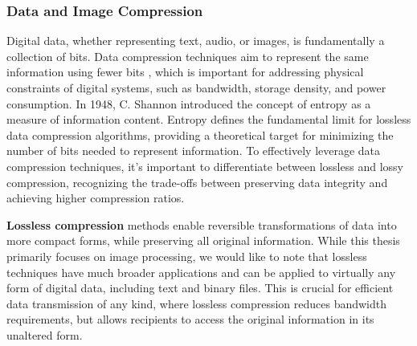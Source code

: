 \subsubsection{Data and Image Compression}
\label{sec:data-and-image-compression}



Digital data, whether representing text, audio, or images, is fundamentally a collection of bits. Data compression techniques aim to represent the same information using fewer bits \cite{hoffman2012data-compression}, which is important for addressing physical constraints of digital systems, such as bandwidth, storage density, and power consumption. In 1948, C. Shannon introduced \cite{shannon1948mathematical} the concept of entropy as a measure of information content. Entropy defines the fundamental limit for lossless data compression algorithms, providing a theoretical target for minimizing the number of bits needed to represent information. To effectively leverage data compression techniques, it's important to differentiate between lossless and lossy compression, recognizing the trade-offs between preserving data integrity and achieving higher compression ratios.



\textbf{Lossless compression} methods enable reversible transformations of data into more compact forms, while preserving all original information. While this thesis primarily focuses on image processing, we would like to note that lossless techniques have much broader applications and can be applied to virtually any form of digital data, including text and binary files. This is crucial for efficient data transmission of any kind, where lossless compression reduces bandwidth requirements, but allows recipients to access the original information in its unaltered \cite{salomon1998data-compression} form.


